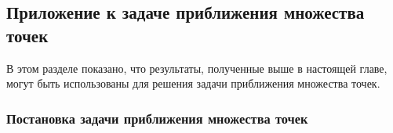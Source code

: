 \documentclass[specialist,
               substylefile = spbu.rtx,
               subf,href,colorlinks=true, 12pt]{disser}
\theoremstyle{definition}
\begin{document}
\subsection{Приложение к задаче приближения множества точек}\label{sec:LF}
В этом разделе показано, что результаты, полученные выше в настоящей главе, могут быть использованы для решения задачи приближения множества точек.

\subsubsection{Постановка задачи приближения множества точек}
\end{document}
